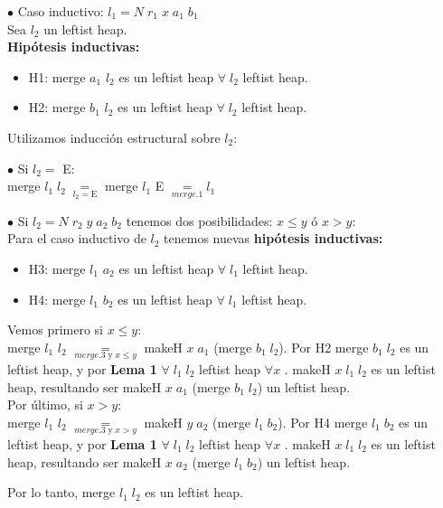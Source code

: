 \documentclass[11pt]{article}
\begin{document}
\noindent $\bullet$ Caso inductivo: $l_1 = N \; r_1 \; x \; a_1 \; b_1$ \\
Sea $l_2$ un leftist heap. \\
\textbf{Hipótesis inductivas:}
\begin{itemize}
  \item H1: merge $a_1$ $l_2$ es un leftist heap $ \forall \; l_2$ leftist heap. 
  \item H2: merge $b_1$ $l_2$ es un leftist heap $ \forall \; l_2$ leftist heap. 
\end{itemize}
Utilizamos inducción estructural sobre $l_2$:

$\bullet$ Si $l_2 =$ E: \\
\indent \indent merge $l_1 \; l_2 \; \underset{l_2 = \text{E}}{=} $ merge $l_1$ E $\underset{merge. 1}{=} l_1$

$\bullet$ Si $l_2 = N \; r_2 \; y \; a_2 \; b_2$ tenemos dos posibilidades:
$x \leq y$ ó $x > y$: \\
Para el caso inductivo de $l_2$ tenemos nuevas \textbf{hipótesis inductivas:}
\begin{itemize}
  \item H3: merge $l_1$ $a_2$ es un leftist heap $ \forall \; l_1$ leftist heap. 
  \item H4: merge $l_1$ $b_2$ es un leftist heap $ \forall \; l_1$ leftist heap.
\end{itemize}

Vemos primero si $x \leq y$: \\
merge $l_1$ $l_2$ $\underset{merge. 3\;\text{y}\;x \leq y}{=}$ makeH $x \; a_1$
(merge $b_1 \; l_2$). Por H2 merge $b_1 \; l_2$ es un leftist heap, y por \textbf{Lema 1}
$\forall \; l_1 \; l_2$ leftist heap $\forall x$ . makeH $x \; l_1 \; l_2$
es un leftist heap, resultando ser makeH $x \; a_1$ (merge $b_1 \; l_2$) un
leftist heap. \\

Por último, si $x > y$: \\
merge $l_1$ $l_2$ $\underset{merge. 3\;\text{y}\;x > y}{=}$ makeH $y \; a_2$
(merge $l_1 \; b_2$). Por H4 merge $l_1 \; b_2$ es un leftist heap, y por \textbf{Lema 1}
$\forall \; l_1 \; l_2$ leftist heap $\forall x$ . makeH $x \; l_1 \; l_2$
es un leftist heap, resultando ser makeH $x \; a_2$ (merge $l_1 \; b_2$) un
leftist heap. \\

\begin{center}
  Por lo tanto, merge $l_1 \; l_2$ es un leftist heap.
\end{center}
\end{document}
